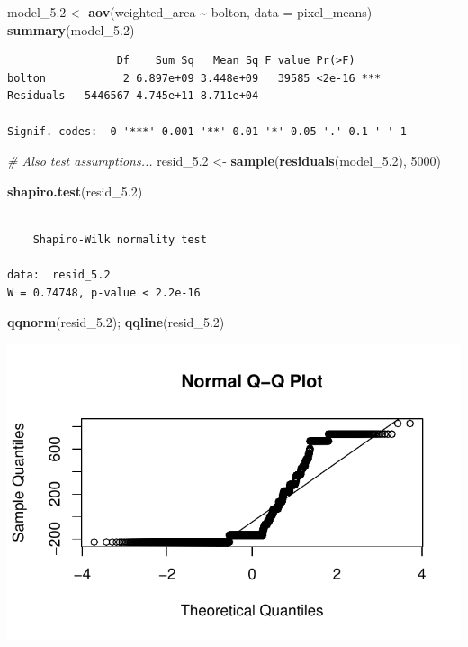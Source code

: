 \documentclass[
  british,
  10pt,
]{article}
\newenvironment{Shaded}{\begin{snugshade}}{\end{snugshade}}
\newcommand{\AttributeTok}[1]{\textcolor[rgb]{0.13,0.29,0.53}{#1}}
\newcommand{\CommentTok}[1]{\textcolor[rgb]{0.56,0.35,0.01}{\textit{#1}}}
\newcommand{\DecValTok}[1]{\textcolor[rgb]{0.00,0.00,0.81}{#1}}
\newcommand{\FloatTok}[1]{\textcolor[rgb]{0.00,0.00,0.81}{#1}}
\newcommand{\FunctionTok}[1]{\textcolor[rgb]{0.13,0.29,0.53}{\textbf{#1}}}
\newcommand{\NormalTok}[1]{#1}
\newcommand{\OtherTok}[1]{\textcolor[rgb]{0.56,0.35,0.01}{#1}}
\newcommand{\SpecialCharTok}[1]{\textcolor[rgb]{0.81,0.36,0.00}{\textbf{#1}}}
\begin{document}
\begin{Shaded}
\begin{Highlighting}[]
\NormalTok{model\_5}\FloatTok{.2} \OtherTok{\textless{}{-}} \FunctionTok{aov}\NormalTok{(weighted\_area }\SpecialCharTok{\textasciitilde{}}\NormalTok{ bolton, }\AttributeTok{data =}\NormalTok{ pixel\_means)}
\FunctionTok{summary}\NormalTok{(model\_5}\FloatTok{.2}\NormalTok{)}
\end{Highlighting}
\end{Shaded}

\begin{verbatim}
                 Df    Sum Sq   Mean Sq F value Pr(>F)    
bolton            2 6.897e+09 3.448e+09   39585 <2e-16 ***
Residuals   5446567 4.745e+11 8.711e+04                   
---
Signif. codes:  0 '***' 0.001 '**' 0.01 '*' 0.05 '.' 0.1 ' ' 1
\end{verbatim}

\begin{Shaded}
\begin{Highlighting}[]
\CommentTok{\# Also test assumptions...}
\NormalTok{resid\_5}\FloatTok{.2} \OtherTok{\textless{}{-}} \FunctionTok{sample}\NormalTok{(}\FunctionTok{residuals}\NormalTok{(model\_5}\FloatTok{.2}\NormalTok{), }\DecValTok{5000}\NormalTok{)}

\FunctionTok{shapiro.test}\NormalTok{(resid\_5}\FloatTok{.2}\NormalTok{)}
\end{Highlighting}
\end{Shaded}

\begin{verbatim}

    Shapiro-Wilk normality test

data:  resid_5.2
W = 0.74748, p-value < 2.2e-16
\end{verbatim}

\begin{Shaded}
\begin{Highlighting}[]
\FunctionTok{qqnorm}\NormalTok{(resid\_5}\FloatTok{.2}\NormalTok{); }\FunctionTok{qqline}\NormalTok{(resid\_5}\FloatTok{.2}\NormalTok{)}
\end{Highlighting}
\end{Shaded}

\begin{center}
\includegraphics[width=0.6\linewidth,height=\textheight,keepaspectratio]{BCB744_Biostats_Prac_Exam_2025_files/figure-pdf/chunk18-1.pdf}
\end{center}
\end{document}
